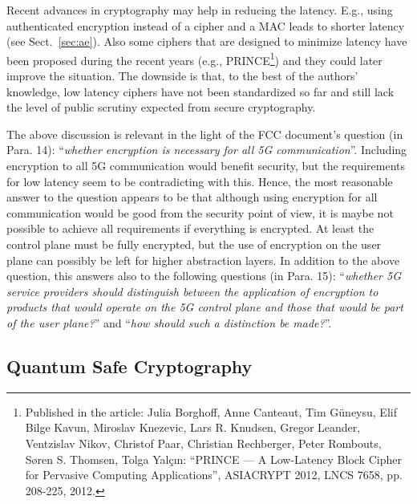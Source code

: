 \documentclass[12pt]{llncs}
\newcommand\ques[1]{``\emph{#1}''}
\begin{document}
Recent advances in cryptography may help in reducing the latency. E.g., using authenticated encryption instead of a cipher and a MAC leads to shorter latency (see Sect.~\ref{sec:ae}). Also some ciphers that are designed to minimize latency have been proposed during the recent years (e.g., PRINCE\footnote{Published in the article: Julia Borghoff, Anne Canteaut, Tim Güneysu, Elif Bilge Kavun, Miroslav Knezevic, Lars R. Knudsen, Gregor Leander, Ventzislav Nikov, Christof Paar, Christian Rechberger, Peter Rombouts, Søren S. Thomsen, Tolga Yalçın: ``PRINCE --- A Low-Latency Block Cipher for Pervasive Computing Applications'', ASIACRYPT 2012, LNCS 7658, pp. 208-225, 2012.}) and they could later improve the situation. The downside is that, to the best of the authors' knowledge, low latency ciphers have not been standardized so far and still lack the level of public scrutiny expected from secure cryptography.

The above discussion is relevant in the light of the FCC document's question (in Para. 14): \ques{whether encryption is necessary for all 5G communication}. Including encryption to all 5G communication would benefit security, but the requirements for low latency seem to be contradicting with this. Hence, the most reasonable answer to the question appears to be that although using encryption for all communication would be good from the security point of view, it is maybe not possible to achieve all requirements if everything is encrypted. At least the control plane must be fully encrypted, but the use of encryption on the user plane can possibly be left for higher abstraction layers. In addition to the above question, this answers also to the following questions (in Para. 15): \ques{whether 5G service providers should distinguish between the application of encryption to products that would operate on the 5G control plane and those that would be part of the user plane?} and \ques{how should such a distinction be made?}.

\subsection{Quantum Safe Cryptography}
\label{sec:qsc}
\end{document}
